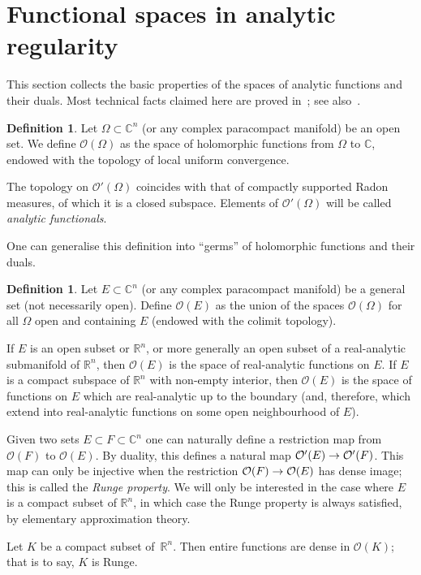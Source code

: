 \documentclass[10pt]{amsart}
\theoremstyle{definition}\newtheorem{defi}[theo]{Definition}\newtheorem{rema}[theo]{Remark}\newtheorem{exam}[theo]{Example}\newtheorem{exem}[theo]{Example}\newtheorem{nota}[theo]{Notation}
\newcommand{\clO}{\mathcal{O}}
\newcommand\1{\mathds{1}}
\newcommand{\R}{\mathbb{R}}
\newcommand{\C}{\mathbb{C}}
\renewcommand*{\to}{\mathchoice{\longrightarrow}{\rightarrow}{\rightarrow}{\rightarrow}}
\begin{document}
\section{Functional spaces in analytic regularity}\label{sec:funct-spac-analyt}

This section collects the basic properties of the spaces of analytic functions and their duals. Most technical facts claimed here are proved in~\cite{hormander_introduction_1973}; see also~\cite[Chapter~6]{treves_analytic_2022}.

\begin{defi}\label{def:space_hol_func}
Let $\Omega\subset \C^n$ (or any complex paracompact manifold) be an open set. We define $\clO(\Omega)$ as the space of holomorphic functions from $\Omega$ to $\C$, endowed with the topology of local uniform convergence.
\end{defi} The topology on $\clO'(\Omega)$ coincides with that of compactly supported Radon measures, of which it is a closed subspace. Elements of $\clO'(\Omega)$ will be called \emph{analytic functionals}.

One can generalise this definition into ``germs'' of holomorphic functions and their duals.

\begin{defi}
Let $E\subset \C^n$ (or any complex paracompact manifold) be a general set (not necessarily open). Define $\clO(E)$ as the union of the spaces $\clO(\Omega)$ for all $\Omega$ open and containing $E$ (endowed with the colimit topology).
\end{defi} If $E$ is an open subset or $\R^n$, or more generally an open subset of a real-analytic submanifold of $\R^n$, then $\clO(E)$ is the space of real-analytic functions on $E$. If $E$ is a compact subspace of $\R^n$ with non-empty interior, then $\clO(E)$ is the space of functions on $E$ which are real-analytic up to the boundary (and, therefore, which extend into real-analytic functions on some open neighbourhood of $E$).

Given two sets $E\subset F\subset \C^n$ one can naturally define a restriction map from $\clO(F)$ to $\clO(E)$. By duality, this defines a natural map $\clO'(E)\to \clO'(F)$. This map can only be injective when the restriction $\clO(F)\to \clO(E)$ has dense image; this is called the \emph{Runge property}. We will only be interested in the case where $E$ is a compact subset of $\R^n$, in which case the Runge property is always satisfied, by elementary approximation theory.

\begin{prop}
\label{prop:real_cpts_are_Runge}
Let $K$ be a compact subset of~$\R^n$. Then entire functions are dense in $\clO(K)$; that is to say, $K$ is Runge.
\end{prop}
\end{document}
